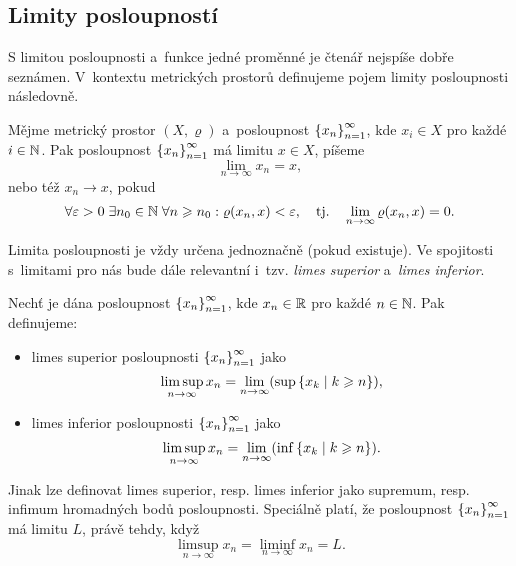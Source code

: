 \subsection{Limity posloupností}\label{subsec:limity-posl-mp}

S limitou posloupnosti a~funkce jedné proměnné je čtenář nejspíše dobře seznámen. V~kontextu metrických prostorů definujeme pojem limity posloupnosti následovně.
\begin{definition}\label{def:limita-mp}
    Mějme metrický prostor $(X,\varrho)$ a~posloupnost $\left\{x_n\right\}_{n=1}^\infty$, kde $x_i\in X$ pro každé $i\in\mathbb{N}$. Pak posloupnost $\left\{x_n\right\}_{n=1}^\infty$ má limitu $x\in X$, píšeme
    \[\lim_{n\to\infty}x_n=x,\]
    nebo též $x_n\to x$, pokud
    \[\forall\varepsilon>0\;\exists n_0\in\mathbb{N}\;\forall n\geqslant n_0: \varrho(x_n,x)<\varepsilon,\quad\text{tj.}\quad\lim_{n\to\infty}\varrho(x_n,x)=0.\]
\end{definition}
Limita posloupnosti je vždy určena jednoznačně (pokud existuje). Ve spojitosti s~limitami pro nás bude dále relevantní i~tzv. \emph{limes superior} a~\emph{limes inferior}.
\begin{definition}\label{def:limsup-liminf-mp}
    Nechť je dána posloupnost $\left\{x_n\right\}_{n=1}^\infty$, kde $x_n\in\mathbb{R}$ pro každé $n\in\mathbb{N}$. Pak definujeme:
    \begin{itemize}
        \item limes superior posloupnosti $\left\{x_n\right\}_{n=1}^\infty$ jako
        \[\limsup_{n\to\infty}x_n=\lim_{n\to\infty}(\sup\left\{x_k\mid k\geqslant n\right\}),\]
        \item limes inferior posloupnosti $\left\{x_n\right\}_{n=1}^\infty$ jako
        \[\limsup_{n\to\infty}x_n=\lim_{n\to\infty}(\inf\left\{x_k\mid k\geqslant n\right\}).\]
    \end{itemize}
\end{definition}
Jinak lze definovat limes superior, resp. limes inferior jako supremum, resp. infimum hromadných bodů posloupnosti. Speciálně platí, že posloupnost $\left\{x_n\right\}_{n=1}^\infty$ má limitu $L$, právě tehdy, když
\[\limsup_{n\to\infty}x_n=\liminf_{n\to\infty}x_n=L.\]

